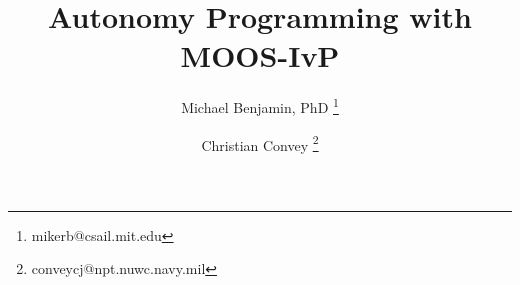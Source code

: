 \documentclass[letterpaper,10pt]{book}
\begin{document}
\begin{titlepage}
\title{Autonomy Programming with MOOS-IvP}
\author{
	Michael Benjamin, PhD
	\thanks{mikerb@csail.mit.edu}
\and
	Christian Convey
	\thanks{conveycj@npt.nuwc.navy.mil}
}
\date{}
\maketitle
\end{titlepage}








\appendix




\end{document}
